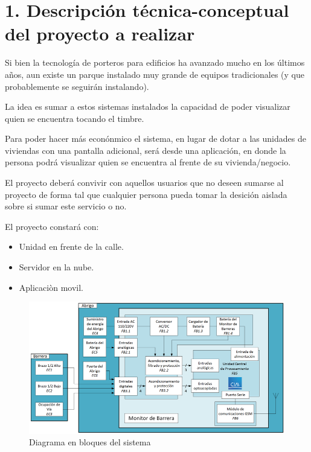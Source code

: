 \documentclass[
11pt, %
codirector, %
]{charter}
\begin{document}
\section{1. Descripción técnica-conceptual del proyecto a realizar}
\label{sec:descripcion}



Si bien la tecnología de porteros para edificios ha avanzado mucho en los últimos años, aun existe un parque instalado muy grande de equipos tradicionales (y que probablemente se seguirán instalando). 

La idea es sumar a estos sistemas instalados la capacidad de poder visualizar quien se encuentra tocando el timbre. 

Para poder hacer más econónmico el sistema, en lugar de dotar a las unidades de viviendas con una pantalla adicional, será desde una aplicación, en donde la persona podrá visualizar quien se encuentra al frente de su vivienda/negocio.

El proyecto deberá convivir con aquellos usuarios que no deseen sumarse al proyecto de forma tal que cualquier persona pueda tomar la desición aislada sobre si sumar este servicio o no. 

El proyecto constará con:

\begin{itemize}
	\item Unidad en frente de la calle.
	\item Servidor en la nube.
	\item Aplicaciòn movil.


\end{itemize}

\begin{figure}[htpb]
\centering 
\includegraphics[width=.5\textwidth]{./Figuras/diagBloques.png}
\caption{Diagrama en bloques del sistema}
\label{fig:diagBloques}
\end{figure}
\end{document}
